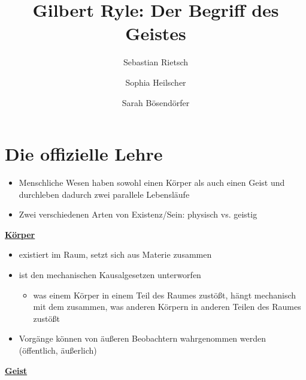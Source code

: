 \documentclass[landscape, twocolumn]{article}
\title{Gilbert Ryle: Der Begriff des Geistes}
\author{Sebastian Rietsch \and Sophia Heilscher \and Sarah Bösendörfer}
\begin{document}
\maketitle

\section{Die offizielle Lehre}
\begin{itemize}
    \item
        Menschliche Wesen haben sowohl einen Körper als auch einen Geist und durchleben dadurch zwei parallele Lebensläufe
    \item
        Zwei verschiedenen Arten von Existenz/Sein: physisch vs. geistig
\end{itemize}

    \begin{center} \underline{\textbf{Körper}} \end{center}
        \begin{itemize}
            \item
                existiert im Raum, setzt sich aus Materie zusammen
            \item
                ist den mechanischen Kausalgesetzen unterworfen
                \begin{itemize}
                    \item
                        was einem Körper in einem Teil des Raumes zustößt, hängt mechanisch mit dem zusammen, was anderen Körpern in anderen Teilen des Raumes zustößt
                
                \end{itemize}
            \item
                Vorgänge können von äußeren Beobachtern wahrgenommen werden (öffentlich, äußerlich)
        \end{itemize}
     \begin{center} \underline{\textbf{Geist}} \end{center}
\end{document}
